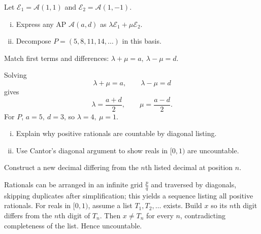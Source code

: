 \begin{problem}
Let $\mathcal{E}_1=\mathcal{A}(1,1)$ and $\mathcal{E}_2=\mathcal{A}(1,-1)$.
\begin{enumerate}[(i)]
\item Express any AP $\mathcal{A}(a,d)$ as $\lambda\mathcal{E}_1+\mu\mathcal{E}_2$.
\item Decompose $P=(5,8,11,14,\dots)$ in this basis.
\end{enumerate}
\end{problem}
\begin{hint}
Match first terms and differences:
$\lambda+\mu=a,\ \lambda-\mu=d$.
\end{hint}
\begin{solution}
Solving
\[
\lambda+\mu=a,\qquad \lambda-\mu=d
\]
gives
\[
\lambda=\frac{a+d}{2},\qquad \mu=\frac{a-d}{2}.
\]
For $P$, $a=5,\ d=3$, so $\lambda=4,\ \mu=1$.
\end{solution}

\begin{problem}
\begin{enumerate}[(i)]
\item Explain why positive rationals are countable by diagonal listing.
\item Use Cantor's diagonal argument to show reals in $[0,1)$ are uncountable.
\end{enumerate}
\end{problem}
\begin{hint}
Construct a new decimal differing from the $n$th listed decimal at position $n$.
\end{hint}
\begin{solution}
Rationals can be arranged in an infinite grid $\frac{p}{q}$ and traversed by diagonals, skipping duplicates after simplification; this yields a sequence listing all positive rationals.
For reals in $[0,1)$, assume a list $T_1,T_2,\dots$ exists. Build $x$ so its $n$th digit differs from the $n$th digit of $T_n$. Then $x\neq T_n$ for every $n$, contradicting completeness of the list. Hence uncountable.
\end{solution}

